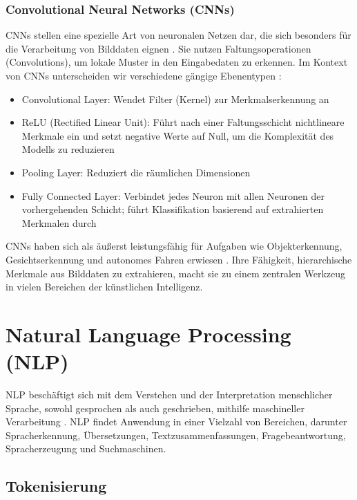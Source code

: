 \subsubsection{Convolutional Neural Networks (CNNs)}
\label{subsubsec:cnn}

\glspl{CNN} stellen eine spezielle Art von neuronalen Netzen dar, die sich besonders für die Verarbeitung von Bilddaten eignen \parencite{RebalaGopinath2019AItM}. Sie nutzen Faltungsoperationen (Convolutions), um lokale Muster in den Eingabedaten zu erkennen. Im Kontext von \glspl{CNN} unterscheiden wir verschiedene gängige Ebenentypen \parencite{RebalaGopinath2019AItM}:

\begin{itemize}
	\item Convolutional Layer: Wendet Filter (Kernel) zur Merkmalserkennung an
	\item ReLU (Rectified Linear Unit): Führt nach einer Faltungsschicht nichtlineare Merkmale ein und setzt negative Werte auf Null, um die Komplexität des Modells zu reduzieren
	\item Pooling Layer: Reduziert die räumlichen Dimensionen
	\item Fully Connected Layer: Verbindet jedes Neuron mit allen Neuronen der vorhergehenden Schicht; führt Klassifikation basierend auf extrahierten Merkmalen durch
\end{itemize}

CNNs haben sich als äußerst leistungsfähig für Aufgaben wie Objekterkennung, Gesichtserkennung und autonomes Fahren erwiesen \parencite{RebalaGopinath2019AItM}. Ihre Fähigkeit, hierarchische Merkmale aus Bilddaten zu extrahieren, macht sie zu einem zentralen Werkzeug in vielen Bereichen der künstlichen Intelligenz.

\section{Natural Language Processing (NLP)}
\label{sec:nlp}

\gls{NLP} beschäftigt sich mit dem Verstehen und der Interpretation menschlicher Sprache, sowohl gesprochen als auch geschrieben, mithilfe maschineller Verarbeitung \parencite{RebalaGopinath2019AItM}. \gls{NLP} findet Anwendung in einer Vielzahl von Bereichen, darunter Spracherkennung, Übersetzungen, Textzusammenfassungen, Fragebeantwortung, Spracherzeugung und Suchmaschinen.

\subsection{Tokenisierung}
\label{subsec:tokenisierung}


